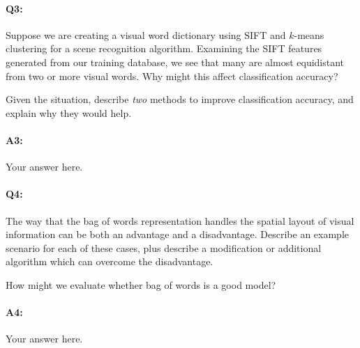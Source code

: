 
\pagebreak
\paragraph{Q3:} Suppose we are creating a visual word dictionary using SIFT and $k$-means clustering for a scene recognition algorithm. Examining the SIFT features generated from our training database, we see that many are almost equidistant from two or more visual words. Why might this affect classification accuracy?

Given the situation, describe \emph{two} methods to improve classification accuracy, and explain why they would help.

\paragraph{A3:} Your answer here.




\pagebreak
\paragraph{Q4:} The way that the bag of words representation handles the spatial layout of visual information can be both an advantage and a disadvantage. Describe an example scenario for each of these cases, plus describe a modification or additional algorithm which can overcome the disadvantage. 

How might we evaluate whether bag of words is a good model?

\paragraph{A4:} Your answer here.








